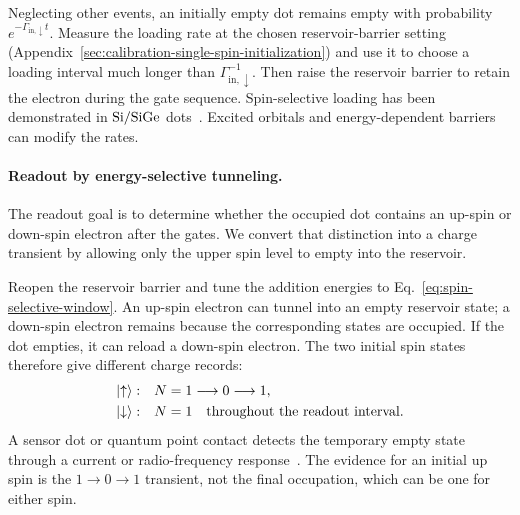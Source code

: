 Neglecting other events, an initially empty dot remains empty with
probability $e^{-\Gamma_{\mathrm{in},\downarrow}t}$.
Measure the loading rate at the chosen reservoir-barrier setting
(Appendix~\ref{sec:calibration-single-spin-initialization}) and use
it to choose a loading interval much longer than
$\Gamma_{\mathrm{in},\downarrow}^{-1}$. Then raise the reservoir
barrier to retain the electron during the gate sequence.
Spin-selective loading has been demonstrated in
$\mathrm{Si}/\mathrm{Si}\mathrm{Ge}$ dots~\cite{Simmons2011}.
Excited orbitals and energy-dependent barriers can modify the rates.

\paragraph{Readout by energy-selective tunneling.}
\label{sec:energy-selective-readout}

The readout goal is to determine whether the occupied dot contains
an up-spin or down-spin electron after the gates.
We convert that distinction into a charge transient by allowing
only the upper spin level to empty into the reservoir.

Reopen the reservoir barrier and tune the addition energies to
Eq.~\eqref{eq:spin-selective-window}.
An up-spin electron can tunnel into an empty reservoir state;
a down-spin electron remains because the corresponding states
are occupied. If the dot empties, it can reload a down-spin electron.
The two initial spin states therefore give different charge records:
\begin{equation}
  \begin{aligned}
    \ket{\uparrow}:&\quad N=1\longrightarrow0\longrightarrow1,\\
    \ket{\downarrow}:&\quad N=1\quad\text{throughout the readout interval}.
  \end{aligned}
  \label{eq:energy-readout-records}
\end{equation}
A sensor dot or quantum point contact detects the temporary empty
state through a current or radio-frequency response~\cite{Elzerman2004}.
The evidence for an initial up spin is the $1\to0\to1$ transient,
not the final occupation, which can be one for either spin.

